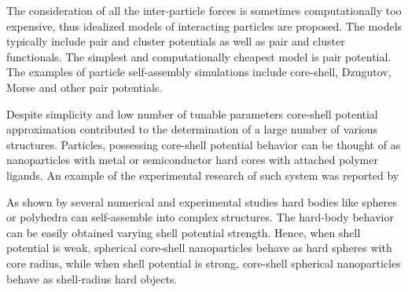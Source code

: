 The consideration of all the inter-particle forces is sometimes computationally too expensive, thus idealized models of interacting particles are proposed. The models typically include pair and cluster potentials as well as pair and cluster functionals. The simplest and computationally cheapest model is pair potential. The examples of particle self-assembly simulations  include core-shell,\cite{dotera2014mosaic, coreshell1,stability} Dzugutov,\cite{dzugutpote} Morse\cite{morzepot} and other pair potentials.

Despite simplicity and low number of tunable parameters core-shell potential approximation contributed to the determination of a large number of various structures.\cite{dotera2014mosaic} Particles, possessing core-shell potential behavior can be thought of as nanoparticles with metal or semiconductor hard cores with attached polymer ligands. An example of the experimental research of such system was reported by %
\citet{ligandsexample} 

As shown by several numerical and experimental studies hard bodies like spheres\cite{hardspherepack} or polyhedra\cite{engelscience} can self-assemble into complex structures. The hard-body behavior can be easily obtained varying shell potential strength. Hence, when shell potential is weak, spherical core-shell nanoparticles behave as hard spheres with core radius, while when shell potential is strong, core-shell spherical nanoparticles behave as shell-radius hard objects. %


